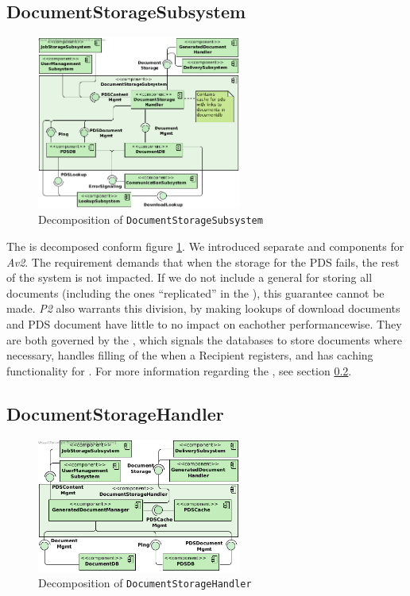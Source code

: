 \subsection{DocumentStorageSubsystem}\label{sec:decomp-docstosub}
\begin{figure}[!htp]
    \centering
    \includegraphics[width=0.6\textwidth]{figures/Document Storage Subsystem.png}
    \caption{Decomposition of \texttt{DocumentStorageSubsystem}}\label{fig:decomp-docstosub}
\end{figure}

The  is decomposed conform figure \ref{fig:decomp-docstosub}. We introduced separate  and  components for \emph{Av2}. The requirement demands that when the storage for the PDS fails, the rest of the system is not impacted. If we do not include a general  for storing all documents (including the ones ``replicated'' in the ), this guarantee cannot be made. \emph{P2} also warrants this division, by making lookups of download documents and PDS document have little to no impact on eachother performancewise. They are both governed by the , which signals the databases to store documents where necessary, handles filling of the  when a Recipient registers, and has caching functionality for . For more information regarding the , see section \ref{sec:decomp-docstohan}.

\subsection{DocumentStorageHandler}\label{sec:decomp-docstohan}
\begin{figure}[!htp]
    \centering
    \includegraphics[width=0.6\textwidth]{figures/DocumentStorageHandler.png}
    \caption{Decomposition of \texttt{DocumentStorageHandler}}\label{fig:decomp-docstohan}
\end{figure}

